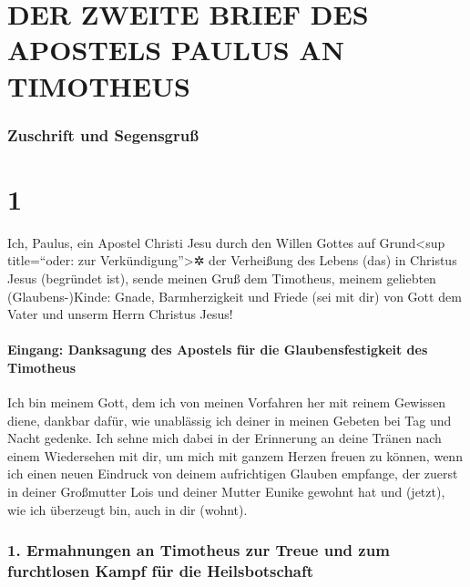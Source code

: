 \hypertarget{der-zweite-brief-des-apostels-paulus-an-timotheus}{%
\section{DER ZWEITE BRIEF DES APOSTELS PAULUS AN
TIMOTHEUS}\label{der-zweite-brief-des-apostels-paulus-an-timotheus}}

\hypertarget{zuschrift-und-segensgruuxdf}{%
\subsubsection{Zuschrift und
Segensgruß}\label{zuschrift-und-segensgruuxdf}}

\hypertarget{section}{%
\section{1}\label{section}}

 Ich, Paulus, ein Apostel Christi Jesu durch den Willen
Gottes auf Grund\textless sup title=``oder: zur
Verkündigung''\textgreater✲ der Verheißung des Lebens (das) in Christus
Jesus (begründet ist),  sende meinen Gruß dem Timotheus,
meinem geliebten (Glaubens-)Kinde: Gnade, Barmherzigkeit und Friede (sei
mit dir) von Gott dem Vater und unserm Herrn Christus Jesus!

\hypertarget{eingang-danksagung-des-apostels-fuxfcr-die-glaubensfestigkeit-des-timotheus}{%
\paragraph{Eingang: Danksagung des Apostels für die Glaubensfestigkeit
des
Timotheus}\label{eingang-danksagung-des-apostels-fuxfcr-die-glaubensfestigkeit-des-timotheus}}

 Ich bin meinem Gott, dem ich von meinen Vorfahren her mit
reinem Gewissen diene, dankbar dafür, wie unablässig ich deiner in
meinen Gebeten bei Tag und Nacht gedenke.  Ich sehne mich
dabei in der Erinnerung an deine Tränen nach einem Wiedersehen mit dir,
um mich mit ganzem Herzen freuen zu können,  wenn ich
einen neuen Eindruck von deinem aufrichtigen Glauben empfange, der
zuerst in deiner Großmutter Lois und deiner Mutter Eunike gewohnt hat
und (jetzt), wie ich überzeugt bin, auch in dir (wohnt).

\hypertarget{ermahnungen-an-timotheus-zur-treue-und-zum-furchtlosen-kampf-fuxfcr-die-heilsbotschaft}{%
\subsubsection{1. Ermahnungen an Timotheus zur Treue und zum furchtlosen
Kampf für die
Heilsbotschaft}\label{ermahnungen-an-timotheus-zur-treue-und-zum-furchtlosen-kampf-fuxfcr-die-heilsbotschaft}}

